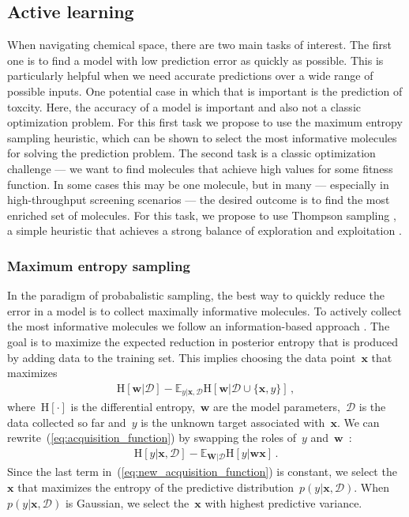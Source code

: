 \documentclass{pnastwo}
\begin{document}
\begin{article}
\subsection{Active learning}

When navigating chemical space, there are two main tasks of interest.  The first one is to find a model with low prediction error as quickly as possible.
This is particularly helpful when we need accurate predictions over a wide range of possible inputs. One potential case in which that is important is the prediction of toxcity.  Here, the accuracy of a model is important and  also not a classic optimization problem. For this first task we propose to use the maximum entropy sampling heuristic, which can be shown to select the most informative molecules for solving
the prediction problem.  The second task is a classic optimization challenge --- we want to find molecules that achieve high values for some fitness
function.  In some cases this may be one molecule, but in many --- especially in high-throughput screening scenarios \cite{pyzer-knapp_what_2015} --- the
desired outcome is to find the most enriched set of molecules. For this task, we propose to use Thompson sampling \cite{thompson_likelihood_1933}, a simple
heuristic that achieves a strong balance of exploration and exploitation \cite{Chapelle2011}.

\subsubsection{Maximum entropy sampling}

In the paradigm of probabalistic sampling, the best way to quickly reduce the error in a model is to collect maximally informative molecules. To actively collect the most informative molecules we follow an information-based approach \cite{Mackay1992}. The goal is to maximize the expected reduction in posterior entropy that is produced by adding data to the training set. This implies choosing the data point~$\mathbf{x}$ that maximizes
\begin{align}
\text{H}[\mathbf{w}|\mathcal{D}] - 
\mathbb{E}_{y|\mathbf{x},\mathcal{D}}\text{H}[\mathbf{w}|\mathcal{D}\cup\{\mathbf{x},y\}]\,,\label{eq:acquisition_function}
\end{align}
where~$\text{H}[\cdot]$ is the differential entropy,~$\mathbf{w}$ are the model parameters,~$\mathcal{D}$ is the data collected so far and~$y$ is the unknown target associated with~$\mathbf{x}$. We can rewrite~(\ref{eq:acquisition_function}) by swapping the roles of~$y$ and~$\mathbf{w}$~\cite{houlsby2012collaborative}:
\begin{align}
\text{H}[y | \mathbf{x},\mathcal{D}] - 
\mathbb{E}_{\mathbf{W} | \mathcal{D}}\text{H}[y | \mathbf{w}\mathbf{x}]\,.\label{eq:new_acquisition_function}
\end{align}
Since the last term in~(\ref{eq:new_acquisition_function}) is constant, we select the~$\mathbf{x}$ that maximizes the entropy of the predictive distribution~$p(y| \mathbf{x},\mathcal{D})$. When $p(y| \mathbf{x},\mathcal{D})$ is Gaussian, we select the~$\mathbf{x}$ with highest predictive variance.


\end{article}
\end{document}
